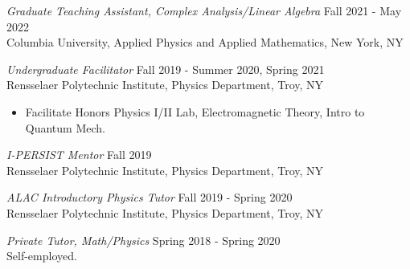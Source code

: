\documentclass[margin]{rpires}
\begin{document}
\begin{resume}
    {\sl Graduate Teaching Assistant, Complex Analysis/Linear Algebra} \hfill Fall 2021 - May 2022 \\
    Columbia University, Applied Physics and Applied Mathematics, New York, NY


    {\sl Undergraduate Facilitator} \hfill Fall 2019 - Summer 2020, Spring 2021 \\
    Rensselaer Polytechnic Institute, Physics Department, Troy, NY
    \begin{itemize}  \itemsep -2pt %
        \item Facilitate Honors Physics I/II Lab, Electromagnetic Theory, Intro to Quantum Mech.
    \end{itemize}

    {\sl I-PERSIST Mentor} \hfill Fall 2019 \\
    Rensselaer Polytechnic Institute, Physics Department, Troy, NY

    {\sl ALAC Introductory Physics Tutor} \hfill Fall 2019 - Spring 2020 \\
    Rensselaer Polytechnic Institute, Physics Department, Troy, NY

    {\sl Private Tutor, Math/Physics} \hfill Spring 2018 - Spring 2020 \\
    Self-employed.
    

\end{resume}
\end{document}

